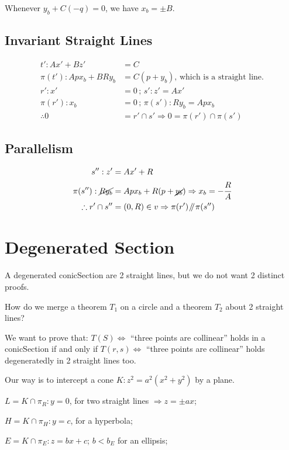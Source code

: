 \documentclass[12pt]{article}
\newcommand{\isParallel}{\mathbin{\!/\mkern-5mu/\!}}
\begin{document}
Whenever $y_b + C(-q) = 0$, we have $x_b = \pm B$.

\subsection{Invariant Straight Lines}

\begin{align}
t': Ax' + Bz' &= C \\
\pi(t'): A px_b + B R y_b &= C(p + y_b)\text{, which is a straight line.} \\
r': x' &= 0\,;\,s': z' = Ax' \\
\pi(r'): x_b &= 0\,;\,\pi(s'): Ry_b = Ap x_b\\ 
\therefore 0 &= r' \cap s' \Rightarrow 0 = \pi(r') \cap \pi(s')
\end{align}

\subsection{Parallelism}

\begin{align}
s'': z' &= Ax' + R \\
\pi(s''): \cancel{Ry_b} &= Ap x_b + R(p + \cancel{y_b}) \Rightarrow x_b = - \cfrac{R}{A} \\
\therefore r' \cap s'' &= (0,R) \in v \Rightarrow \pi(r') \isParallel \pi(s'')
\end{align}

\section{Degenerated Section}

A degenerated conicSection are 2 straight lines, but we do not want 2 distinct proofs. 

How do we merge a theorem $T_1$ on a circle and a theorem $T_2$ about 2 straight lines?

We want to prove that: $T(S)\Leftrightarrow$ ``three points are collinear'' holds in a conicSection if and only if $T(r,s)\Leftrightarrow$ ``three points are collinear'' holds degeneratedly in 2 straight lines too.

Our way is to intercept a cone $K:z^2 = a^2(x^2 + y^2)$ by a plane.

$L = K\cap \pi_R: y = 0$, for two straight lines $\Rightarrow z = \pm ax$;

$H = K\cap \pi_H: y = c$, for a hyperbola;

$E = K\cap \pi_E: z = bx + c$; $b < b_E$ for an ellipsis;
\end{document}

